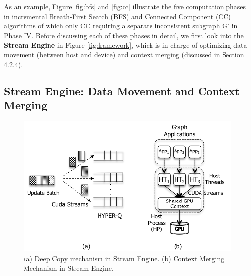 As an example, Figure \ref{fig:bfs} and \ref{fig:cc} illustrate the five computation phases in incremental Breath-First Search (BFS) and Connected Component (CC) algorithms of which only CC requiring a separate inconsistent subgraph G' in Phase IV. Before discussing each of these phases in detail, we first look into the \textbf{Stream Engine} in Figure \ref{fig:framework}, which is in charge of optimizing data movement (between host and device) and context merging (discussed in Section 4.2.4). 

\subsection{Stream Engine: Data Movement and Context Merging}

\begin{figure}[!t]
\centering
\includegraphics[width=\textwidth,height=\textheight,keepaspectratio]{figures/deep.png}
\caption{(a) Deep Copy mechanism in Stream Engine. (b) Context Merging Mechanism in Stream Engine.}
\label{fig:deep}
\end{figure}


